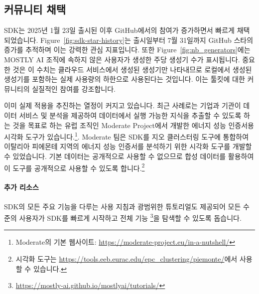 \subsection{커뮤니티 채택}

SDK는 2025년 1월 23일 출시된 이후 GitHub에서의 참여가 증가하면서 빠르게 채택되었습니다. Figure~\ref{fig:sdk-star-history}는 출시일부터 7월 31일까지 GitHub 스타의 증가를 추적하며 이는 강력한 관심 지표입니다.
또한 Figure~\ref{fig:nb_generators}에는 MOSTLY AI 조직에 속하지 않은 사용자가 생성한 주당 생성기 수가 표시됩니다.
중요한 것은 이 수치는 클라우드 서비스에서 생성된 생성기만 나타내므로 로컬에서 생성된 생성기를 포함하는 실제 사용량의 하한으로 사용된다는 것입니다.
이는 툴킷에 대한 커뮤니티의 실질적인 참여를 강조합니다.

이미 실제 적용을 추진하는 열정이 커지고 있습니다.
최근 사례로는 기업과 기관이 데이터 서비스 및 분석을 제공하여 데이터에서 실행 가능한 지식을 추출할 수 있도록 하는 것을 목표로 하는 유럽 조직인 Moderate Project에서 개발한 에너지 성능 인증서용 시각화 도구가 있습니다.\footnote{Moderate의 기본 웹사이트: \url{https://moderate-project.eu/in-a-nutshell/}}.
Moderate 팀은 SDK를 지오 클러스터링 도구에 통합하여 이탈리아 피에몬테 지역의 에너지 성능 인증서를 분석하기 위한 시각화 도구를 개발할 수 있었습니다.
기본 데이터는 공개적으로 사용할 수 없으므로 합성 데이터를 활용하여 이 도구를 공개적으로 사용할 수 있도록 합니다.\footnote{시각화 도구는 \url{https://tools.eeb.eurac.edu/epc_clustering/piemonte/}에서 사용할 수 있습니다.}

\paragraph{추가 리소스}
SDK의 모든 주요 기능을 다루는 사용 지침과 광범위한 튜토리얼도 제공되어 모든 수준의 사용자가 SDK를 빠르게 시작하고 전체 기능 \footnote{\url{https://mostly-ai.github.io/mostlyai/tutorials/}}을 탐색할 수 있도록 돕습니다.
